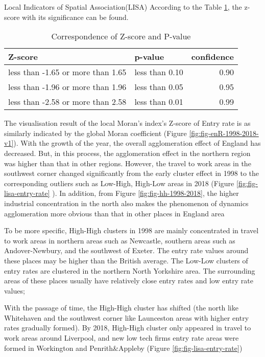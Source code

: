\documentclass[
  12pt,
  oneside]{book}
\begin{document}
Local Indicators of Spatial Association(LISA)
According to the Table \ref{tab:tab-z-p-corr}, the z-score with its significance can be found.

\begin{table}

\caption{\label{tab:tab-z-p-corr}Correspondence of Z-score and P-value}
\centering
\begin{tabular}[t]{llr}
\toprule
\textbf{Z-score} & \textbf{p-value} & \textbf{confidence}\\
\midrule
less than -1.65 or more than 1.65 & less than 0.10 & 0.90\\
less than -1.96 or more than 1.96 & less than 0.05 & 0.95\\
less than -2.58 or more than 2.58 & less than 0.01 & 0.99\\
\bottomrule
\end{tabular}
\end{table}

The visualisation result of the local Moran's index's Z-score of Entry rate is as similarly indicated by the global Moran coefficient (Figure \ref{fig:fig-enR-1998-2018-v1}). With the growth of the year, the overall agglomeration effect of England has decreased. But, in this process, the agglomeration effect in the northern region was higher than that in other regions. However, the travel to work areas in the southwest corner changed significantly from the early cluster effect in 1998 to the corresponding outliers such as Low-High, High-Low areas in 2018 (Figure \ref{fig:fig-lisa-entry-rate} ). In addition, from Figure \ref{fig:fig-hh-1998-2018}, the higher industrial concentration in the north also makes the phenomenon of dynamics agglomeration more obvious than that in other places in England area

To be more specific, High-High clusters in 1998 are mainly concentrated in travel to work areas in northern areas such as Newcastle, southern areas such as Andover-Newbury, and the southwest of Exeter. The entry rate values around these places may be higher than the British average. The Low-Low clusters of entry rates are clustered in the northern North Yorkshire area. The surrounding areas of these places usually have relatively close entry rates and low entry rate values;

With the passage of time, the High-High cluster has shifted (the north like Whitehaven and the southwest corner like Launceston areas with higher entry rates gradually formed). By 2018, High-High cluster only appeared in travel to work areas around Liverpool, and new low tech firms entry rate areas were formed in Workington and Penrith\&Appleby (Figure \ref{fig:fig-lisa-entry-rate})
\end{document}
